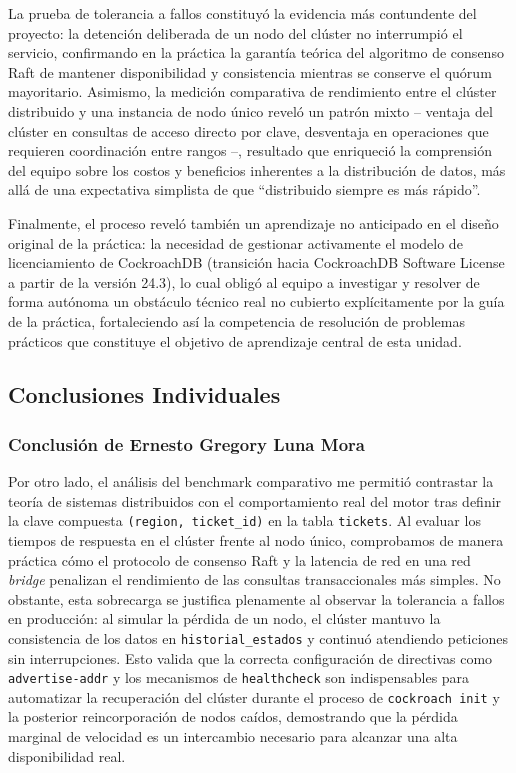 \documentclass[12pt, a4paper]{article}
\begin{document}
La prueba de tolerancia a fallos constituyó la evidencia más contundente del proyecto: la detención deliberada de un nodo del clúster no interrumpió el servicio, confirmando en la práctica la garantía teórica del algoritmo de consenso Raft de mantener disponibilidad y consistencia mientras se conserve el quórum mayoritario. Asimismo, la medición comparativa de rendimiento entre el clúster distribuido y una instancia de nodo único reveló un patrón mixto -- ventaja del clúster en consultas de acceso directo por clave, desventaja en operaciones que requieren coordinación entre rangos --, resultado que enriqueció la comprensión del equipo sobre los costos y beneficios inherentes a la distribución de datos, más allá de una expectativa simplista de que ``distribuido siempre es más rápido''.

Finalmente, el proceso reveló también un aprendizaje no anticipado en el diseño original de la práctica: la necesidad de gestionar activamente el modelo de licenciamiento de CockroachDB (transición hacia CockroachDB Software License a partir de la versión 24.3), lo cual obligó al equipo a investigar y resolver de forma autónoma un obstáculo técnico real no cubierto explícitamente por la guía de la práctica, fortaleciendo así la competencia de resolución de problemas prácticos que constituye el objetivo de aprendizaje central de esta unidad.

\subsection{Conclusiones Individuales}

\subsubsection*{Conclusión de Ernesto Gregory Luna Mora}

  Por otro lado, el análisis del benchmark comparativo me permitió contrastar la teoría de sistemas distribuidos
  con el comportamiento real del motor tras definir la clave compuesta \texttt{(region, ticket\_id)} en la tabla
  \texttt{tickets}. Al evaluar los tiempos de respuesta en el clúster frente al nodo único, comprobamos de manera
  práctica cómo el protocolo de consenso Raft y la latencia de red en una red \textit{bridge} penalizan el
  rendimiento de las consultas transaccionales más simples. No obstante, esta sobrecarga se justifica plenamente al
  observar la tolerancia a fallos en producción: al simular la pérdida de un nodo, el clúster mantuvo la consistencia
  de los datos en \texttt{historial\_estados} y continuó atendiendo peticiones sin interrupciones. Esto valida que la
  correcta configuración de directivas como \texttt{advertise-addr} y los mecanismos de \texttt{healthcheck} son
  indispensables para automatizar la recuperación del clúster durante el proceso de \texttt{cockroach init} y la
  posterior reincorporación de nodos caídos, demostrando que la pérdida marginal de velocidad es un intercambio
  necesario para alcanzar una alta disponibilidad real.
\end{document}
